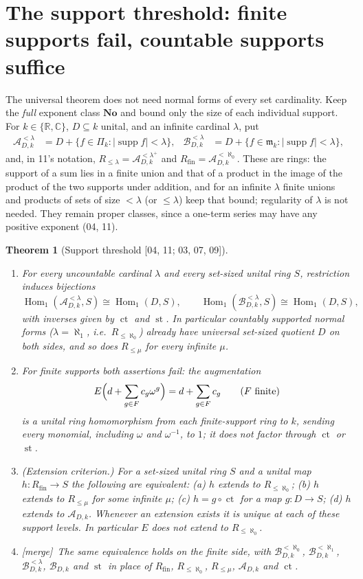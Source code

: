 \documentclass[11pt,letterpaper]{article}
\numberwithin{equation}{section}
\newtheorem{theorem}{Theorem}[section]
\theoremstyle{definition}
\theoremstyle{remark}
\theoremstyle{plain}
\newcommand{\No}{\mathbf{No}}
\newcommand{\R}{\mathbb R}
\newcommand{\C}{\mathbb C}
\newcommand{\A}{\mathcal A}          %
\newcommand{\B}{\mathcal B}          %
\newcommand{\mm}{\mathfrak m}        %
\newcommand{\ct}{\operatorname{ct}}
\newcommand{\st}{\operatorname{st}}
\newcommand{\supp}{\operatorname{supp}}
\newcommand{\Homone}{\operatorname{Hom}_1}
\newcommand{\src}[1]{\textup{\textsf{[#1]}}}
\newcommand{\merge}{\textup{\textsf{[merge]}}}
\begin{document}
\section{The support threshold: finite supports fail, countable supports suffice}\label{osq:sec:support}

The universal theorem does not need normal forms of every set cardinality. Keep the
\emph{full} exponent class $\No$ and bound only the size of each individual support. For
$k\in\{\R,\C\}$, $D\subseteq k$ unital, and an infinite cardinal $\lambda$, put
\begin{align*}
 \A^{<\lambda}_{D,k}&=D+\{f\in\Pi_k:|\supp f|<\lambda\},&
 \B^{<\lambda}_{D,k}&=D+\{f\in\mm_k:|\supp f|<\lambda\},
\end{align*}
and, in 11's notation, $R_{\le\lambda}=\A^{<\lambda^+}_{D,k}$ and
$R_{\mathrm{fin}}=\A^{<\aleph_0}_{D,k}$. These are rings: the support of a sum lies in a
finite union and that of a product in the image of the product of the two supports under
addition, and for an infinite $\lambda$ finite unions and products of sets of size $<\lambda$
(or $\le\lambda$) keep that bound; regularity of $\lambda$ is not needed. They remain
proper classes, since a one-term series may have any positive exponent (04, 11).

\begin{theorem}[Support threshold \src{04, 11; 03, 07, 09}]\label{osq:thm:support}
\leavevmode
\begin{enumerate}
\item For every uncountable cardinal $\lambda$ and every set-sized unital ring $S$,
restriction induces bijections
\[
 \Homone(\A^{<\lambda}_{D,k},S)\cong\Homone(D,S),\qquad
 \Homone(\B^{<\lambda}_{D,k},S)\cong\Homone(D,S),
\]
with inverses given by $\ct$ and $\st$. In particular countably supported normal forms
($\lambda=\aleph_1$, i.e.\ $R_{\le\aleph_0}$) already have universal set-sized quotient $D$
on both sides, and so does $R_{\le\mu}$ for every infinite $\mu$.
\item For finite supports both assertions fail: the \emph{augmentation}
\[
 E\Bigl(d+\sum_{g\in F}c_g\omega^g\Bigr)=d+\sum_{g\in F}c_g\qquad(F\text{ finite})
\]
is a unital ring homomorphism from each finite-support ring to $k$, sending every monomial,
including $\omega$ and $\omega^{-1}$, to $1$; it does not factor through $\ct$ or $\st$.
\item (Extension criterion.) For a set-sized unital ring $S$ and a unital map
$h:R_{\mathrm{fin}}\to S$ the following are equivalent: (a) $h$ extends to $R_{\le\aleph_0}$;
(b) $h$ extends to $R_{\le\mu}$ for some infinite $\mu$; (c) $h=g\circ\ct$ for a map
$g:D\to S$; (d) $h$ extends to $\A_{D,k}$. Whenever an extension exists it is unique at each
of these support levels. In particular $E$ does not extend to $R_{\le\aleph_0}$.
\item \merge\ The same equivalence holds on the finite side, with $\B^{<\aleph_0}_{D,k}$,
$\B^{<\aleph_1}_{D,k}$, $\B^{<\lambda}_{D,k}$, $\B_{D,k}$ and $\st$ in place of
$R_{\mathrm{fin}}$, $R_{\le\aleph_0}$, $R_{\le\mu}$, $\A_{D,k}$ and $\ct$.
\end{enumerate}
\end{theorem}
\end{document}
